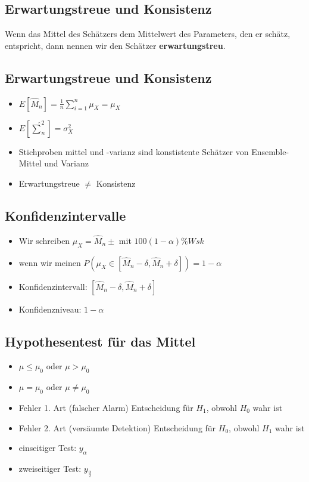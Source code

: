 \documentclass{article}
\begin{document}
\subsection{Erwartungstreue und Konsistenz}
Wenn das Mittel des Schätzers dem Mittelwert des Parameters, den er schätz, entspricht, dann nennen wir den Schätzer \textbf{ erwartungstreu}.



\subsection{Erwartungstreue und Konsistenz}
\begin{itemize}
\item $ E[\hat{M}_n] = \frac{1}{n} \sum_{i=1}^n \mu_X = \mu_X$
\item $E[\hat{\sum}_n^2] = \sigma_X^2$
\item Stichproben mittel und -varianz sind konstistente Schätzer von Ensemble-Mittel und Varianz
\item Erwartungstreue $\neq$ Konsistenz
\end{itemize}



\subsection{Konfidenzintervalle}
\begin{itemize}
\item Wir schreiben $\mu_X = \hat{M}_n \pm $ mit $100(1-\alpha)\% Wsk$
\item wenn wir meinen $P(\mu_X \in [\hat{M}_n - \delta,\hat{M}_n + \delta]) = 1 -\alpha $
\item Konfidenzintervall: $ [\hat{M}_n - \delta,\hat{M}_n + \delta]$
\item Konfidenzniveau: $1-\alpha$
\end{itemize}


\subsection{Hypothesentest für das Mittel}
\begin{itemize}
\item $\mu \leq \mu_0$ oder  $ \mu > \mu_0$ 
\item $\mu =\mu_0$ oder $\mu \neq \mu_0$ 
\item Fehler 1. Art (falscher Alarm) Entscheidung für $H_1$, obwohl $H_0$ wahr ist
\item Fehler 2. Art (versäumte Detektion) Entscheidung für $H_0$, obwohl $H_1$ wahr ist
\item einseitiger Test: $y_\alpha$
\item zweiseitiger Test: $y_\frac{\alpha}{2}$
\end{itemize}
\end{document}
